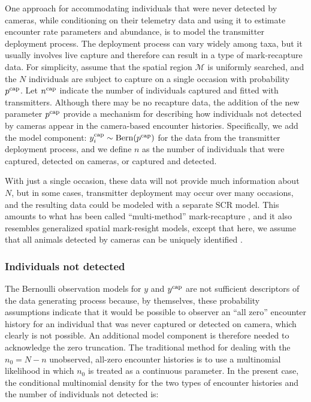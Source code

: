 \documentclass[12pt]{article}
\begin{document}
One approach for accommodating individuals that were never detected by
cameras, while conditioning on their telemetry data and using it to
estimate encounter rate parameters and abundance, is to model the
transmitter deployment process. The deployment process
can vary widely among taxa, but it usually involves live capture
and therefore can result in a type of mark-recapture
data. For simplicity, assume that the spatial region $\mathcal{M}$ is
uniformly searched, and the $N$ individuals are subject to capture on
a single occasion with probability $p^{\rm cap}$. Let $n^{\rm cap}$ indicate
the number of individuals captured and fitted with
transmitters. Although there may be no recapture data, 
the addition of the new parameter $p^{\rm cap}$ provide a mechanism
for describing how individuals not detected by cameras appear in
the camera-based encounter histories. Specifically, 
we add the model component: 
$y^{\rm cap}_i \sim \mathrm{Bern}(p^{\rm cap})$ for the data from the
transmitter deployment process, and we define $n$ as the number of
individuals that were captured, detected on cameras, or captured and
detected. 

With just a single occasion, these
data will not provide much information about $N$, but in some cases,
transmitter deployment may occur over many occasions, and the
resulting data could be modeled with a separate SCR model. This
amounts to what has been called ``multi-method'' mark-recapture
\citep{tourani_etal:2020}, and it also resembles generalized spatial
mark-resight models, except that here, we assume that all animals
detected by cameras can be uniquely identified
\citep{efford_hunter:2018,whittington_etal:2018}. 

\subsubsection{Individuals not detected}
\label{ssec:n0}

The Bernoulli observation models for $y$ and $y^{\rm cap}$
are not sufficient descriptors of the data generating process because,
by themselves, these probability assumptions indicate that it would be
possible to observer an ``all zero'' encounter history for an
individual that was never captured or detected on camera, which
clearly is not possible. An additional model component is therefore
needed to acknowledge the zero truncation. The traditional method for
dealing with the $n_0=N-n$ unobserved, all-zero encounter histories is
to use a multinomial likelihood in which 
$n_0$ is treated as a continuous parameter. In the present case,
the conditional multinomial density for the two types of encounter
histories and the number of individuals not detected is: 
\end{document}
